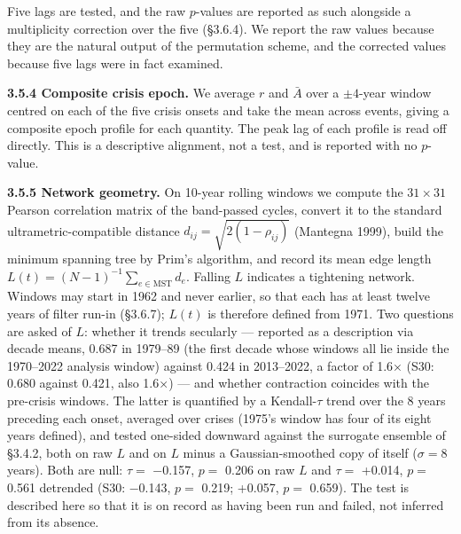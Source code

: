 \documentclass[11pt,a4paper]{article}
\begin{document}
Five lags are tested, and the raw \(p\)-values are reported as such alongside a multiplicity correction over the five (§3.6.4). We report the raw values because they are the natural output of the permutation scheme, and the corrected values because five lags were in fact examined.

\textbf{3.5.4 Composite crisis epoch.} We average \(r\) and \(\bar{A}\) over a \(\pm 4\)-year window centred on each of the five crisis onsets and take the mean across events, giving a composite epoch profile for each quantity. The peak lag of each profile is read off directly. This is a descriptive alignment, not a test, and is reported with no \(p\)-value.

\textbf{3.5.5 Network geometry.} On 10-year rolling windows we compute the \(31\times31\) Pearson correlation matrix of the band-passed cycles, convert it to the standard ultrametric-compatible distance \(d_{ij} = \sqrt{2(1-\rho_{ij})}\) (Mantegna 1999), build the minimum spanning tree by Prim's algorithm, and record its mean edge length \(L(t) = (N-1)^{-1}\sum_{e \in \mathrm{MST}} d_e\). Falling \(L\) indicates a tightening network. Windows may start in 1962 and never earlier, so that each has at least twelve years of filter run-in (§3.6.7); \(L(t)\) is therefore defined from 1971. Two questions are asked of \(L\): whether it trends secularly — reported as a description via decade means, 0.687 in 1979–89 (the first decade whose windows all lie inside the 1970–2022 analysis window) against 0.424 in 2013–2022, a factor of 1.6× (S30: 0.680 against 0.421, also 1.6×) — and whether contraction coincides with the pre-crisis windows. The latter is quantified by a Kendall-\(\tau\) trend over the 8 years preceding each onset, averaged over crises (1975's window has four of its eight years defined), and tested one-sided downward against the surrogate ensemble of §3.4.2, both on raw \(L\) and on \(L\) minus a Gaussian-smoothed copy of itself (\(\sigma = 8\) years). Both are null: \(\tau =\) −0.157, \(p =\) 0.206 on raw \(L\) and \(\tau =\) +0.014, \(p =\) 0.561 detrended (S30: −0.143, \(p =\) 0.219; +0.057, \(p =\) 0.659). The test is described here so that it is on record as having been run and failed, not inferred from its absence.
\end{document}
